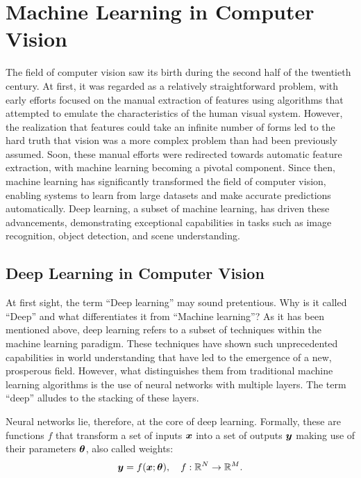 
\section{Machine Learning in Computer Vision}\label{sec:ml}

The field of computer vision saw its birth during the second half of the twentieth century. At first, it was regarded as a relatively straightforward problem, with early efforts focused on the manual extraction of features using algorithms that attempted to emulate the characteristics of the human visual system. However, the realization that features could take an infinite number of forms led to the hard truth that vision was a more complex problem than had been previously assumed. Soon, these manual efforts were redirected towards automatic feature extraction, with machine learning becoming a pivotal component. Since then, machine learning has significantly transformed the field of computer vision, enabling systems to learn from large datasets and make accurate predictions automatically. Deep learning, a subset of machine learning, has driven these advancements, demonstrating exceptional capabilities in tasks such as image recognition, object detection, and scene understanding. 

\subsection{Deep Learning in Computer Vision}
\label{subsec:deep_learning}
At first sight, the term ``Deep learning'' may sound pretentious. Why is it called ``Deep'' and what differentiates it from ``Machine learning''?  As it has been mentioned above, deep learning refers to a subset of techniques within the machine learning paradigm. These techniques have shown such unprecedented capabilities in world understanding that have led to the emergence of a new, prosperous field. However, what distinguishes them from traditional machine learning algorithms is the use of neural networks with multiple layers. The term ``deep'' alludes to the stacking of these layers.

Neural networks lie, therefore, at the core of deep learning. Formally, these are functions $f$ that transform a set of inputs $\boldsymbol{x}$ into a set of outputs $\boldsymbol{y}$ making use of their parameters $\boldsymbol{\theta}$, also called weights: 
\begin{equation*}
    \boldsymbol{y} = f(\boldsymbol{x};\boldsymbol{\theta}), \quad f: \mathbb{R}^N \rightarrow \mathbb{R}^M.
\end{equation*}

